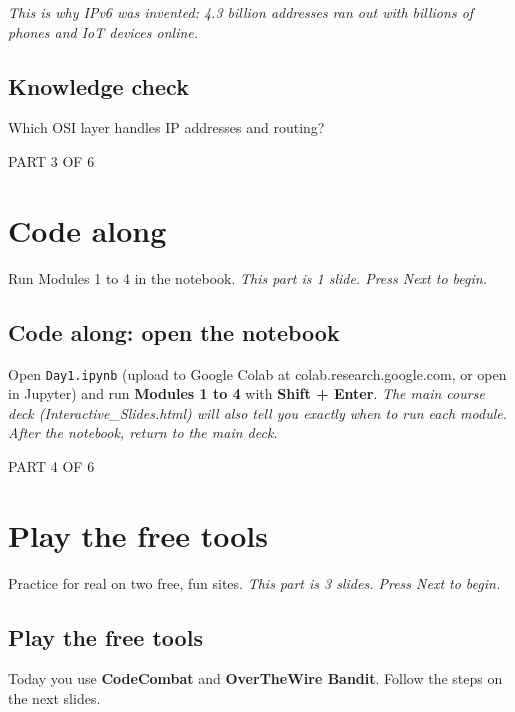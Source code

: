\documentclass[12pt,openany]{book}
\begin{document}
{\small\itshape\color{gray}This is why IPv6 was invented: 4.3 billion addresses ran out with billions of phones and IoT devices online.}

\medskip

\subsection*{Knowledge check}

Which OSI layer handles IP addresses and routing?

\vspace{4pt}\noindent\textsc{PART 3 OF 6}


\section*{Code along}

Run Modules 1 to 4 in the notebook.
{\small\itshape\color{gray}This part is 1 slide. Press Next to begin.}

\medskip

\subsection*{Code along: open the notebook}

Open \texttt{Day1.ipynb} (upload to Google Colab at colab.research.google.com, or open in Jupyter) and run \textbf{Modules 1 to 4} with \textbf{Shift + Enter}.
{\small\itshape\color{gray}The main course deck (Interactive\_Slides.html) will also tell you exactly when to run each module. After the notebook, return to the main deck.}

\medskip

\vspace{4pt}\noindent\textsc{PART 4 OF 6}


\section*{Play the free tools}

Practice for real on two free, fun sites.
{\small\itshape\color{gray}This part is 3 slides. Press Next to begin.}

\medskip

\subsection*{Play the free tools}

Today you use \textbf{CodeCombat} and \textbf{OverTheWire Bandit}. Follow the steps on the next slides.
\end{document}
